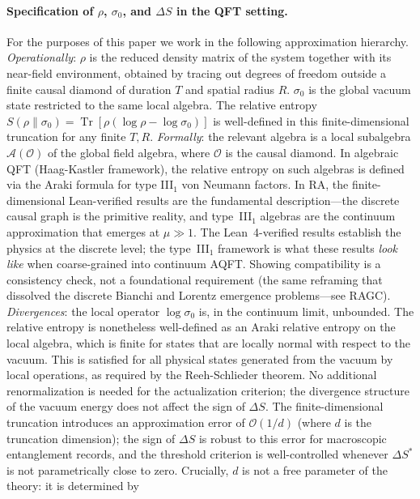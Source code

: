 \documentclass[11pt,a4paper]{article}
\theoremstyle{plain}
\theoremstyle{definition}
\theoremstyle{remark}
\begin{document}
\paragraph{Specification of $\rho$, $\sigma_0$, and $\Delta S$ in the QFT setting.}
For the purposes of this paper we work in the following approximation hierarchy.
\emph{Operationally}: $\rho$ is the reduced density matrix of the system together
with its near-field environment, obtained by tracing out degrees of freedom outside
a finite causal diamond of duration $T$ and spatial radius $R$. $\sigma_0$ is the
global vacuum state restricted to the same local algebra. The relative entropy
$S(\rho\|\sigma_0) = \operatorname{Tr}[\rho(\log\rho - \log\sigma_0)]$ is
well-defined in this finite-dimensional truncation for any finite $T, R$.
\emph{Formally}: the relevant algebra is a local subalgebra $\mathcal{A}(\mathcal{O})$
of the global field algebra, where $\mathcal{O}$ is the causal diamond. In
algebraic QFT (Haag-Kastler framework), the relative entropy on such algebras is
defined via the Araki formula for type III$_1$ von Neumann factors. In
RA, the finite-dimensional Lean-verified results are the fundamental
description---the discrete causal graph is the primitive reality, and
type~III$_1$ algebras are the continuum approximation that emerges at
$\mu \gg 1$. The Lean~4-verified results establish the physics at the
discrete level; the type~III$_1$ framework is what these results
\emph{look like} when coarse-grained into continuum AQFT. Showing
compatibility is a consistency check, not a foundational requirement
(the same reframing that dissolved the discrete Bianchi and Lorentz
emergence problems---see RAGC).
\emph{Divergences}: the local operator $\log\sigma_0$ is, in the continuum
limit, unbounded. The relative entropy is nonetheless well-defined as an
Araki relative entropy on the local algebra, which is finite for states
that are locally normal with respect to the vacuum. This is satisfied for
all physical states generated from the vacuum by local operations, as
required by the Reeh-Schlieder theorem. No additional renormalization is
needed for the actualization criterion; the divergence structure of the
vacuum energy does not affect the sign of $\Delta S$.
The finite-dimensional truncation introduces an approximation error of
$\mathcal{O}(1/d)$ (where $d$ is the truncation dimension); the sign
of $\Delta S$ is robust to this error for macroscopic entanglement records,
and the threshold criterion is well-controlled whenever $\Delta S^*$
is not parametrically close to zero.
Crucially, $d$ is not a free parameter of the theory: it is determined by
\end{document}
